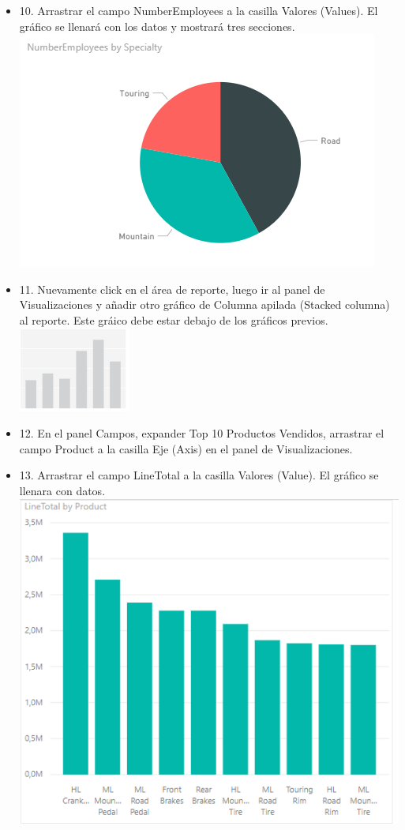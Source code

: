 \begin{itemize}
\item 10. Arrastrar el campo NumberEmployees a la casilla Valores (Values). El gráfico se llenará con los datos y mostrará tres secciones. \\
\includegraphics[scale=0.5]{./Imagenes/image023}
\item 11. Nuevamente click en el área de reporte, luego ir al panel de Visualizaciones y añadir otro gráfico de Columna apilada (Stacked columna) al reporte. Este gráico debe estar debajo de los gráficos previos. \\
\includegraphics[scale=0.5]{./Imagenes/image024}

\item 12. En el panel Campos, expander Top 10 Productos Vendidos, arrastrar el campo Product a la casilla Eje (Axis) en el panel de Visualizaciones. \\

\item 13. Arrastrar el campo LineTotal a la casilla Valores (Value). El gráfico se llenara con datos. \\
\includegraphics[scale=0.5]{./Imagenes/image026}


\end{itemize}
